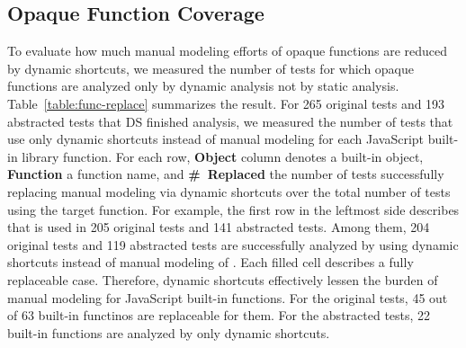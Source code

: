 \subsection{Opaque Function Coverage}
To evaluate how much manual modeling efforts of opaque functions
are reduced by dynamic shortcuts, we measured the number of tests for which
opaque functions are analyzed only by dynamic analysis not by
static analysis.  Table~\ref{table:func-replace} summarizes the result.
For 265 original tests and 193 abstracted tests that DS finished analysis, we measured the
number of tests that use only dynamic shortcuts instead of manual modeling
for each JavaScript built-in library function.  For each row,
\textbf{Object} column denotes a built-in object, \textbf{Function} a function
name, and \textbf{\#~Replaced} the number of tests successfully replacing manual
modeling via dynamic shortcuts over the total number of tests using the target function.
For example, the first row in the leftmost side describes that  is used in
205 original tests and 141 abstracted tests.  Among them, 204 original
tests and 119 abstracted tests are successfully analyzed by using dynamic shortcuts
instead of manual modeling of .  Each filled cell describes
a fully replaceable case.  Therefore, dynamic
shortcuts effectively lessen the burden of manual modeling for JavaScript
built-in functions. For the original tests, 45 out of 63 built-in functinos are replaceable
for them.  For the abstracted tests, 22 built-in functions are analyzed by only dynamic shortcuts.
